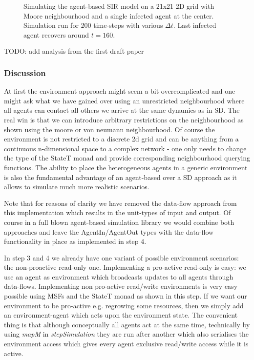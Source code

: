 \begin{figure}
\begin{center}
	\caption{Simulating the agent-based SIR model on a 21x21 2D grid with Moore neighbourhood and a single infected agent at the center. Simulation run for 200 time-steps with various $\Delta t$. Last infected agent recovers around $t = 160$.}
	\label{fig:sir_env}
\end{center}
\end{figure}

TODO: add analysis from the first draft paper

\subsubsection{Discussion}
At first the environment approach might seem a bit overcomplicated and one might ask what we have gained over using an unrestricted neighbourhood where all agents can contact all others we arrive at the same dynamics as in SD. The real win is that we can introduce arbitrary restrictions on the neighbourhood as shown using the moore or von neumann neighbourhood. 
Of course the environment is not restricted to a discrete 2d grid and can be anything from a continuous n-dimensional space to a complex network - one only needs to change the type of the StateT monad and provide corresponding neighbourhood querying functions. The ability to place the heterogeneous agents in a generic environment is also the fundamental advantage of an agent-based over a SD approach as it allows to simulate much more realistic scenarios.

Note that for reasons of clarity we have removed the data-flow approach from this implementation which results in the unit-types of input and output. Of course in a full blown agent-based simulation library we would combine both approaches and leave the AgentIn/AgentOut types with the data-flow functionality in place as implemented in step 4.

In step 3 and 4 we already have one variant of possible environment scenarios: the non-proactive read-only one. Implementing a pro-active read-only is easy: we use an agent as environment which broadcasts updates to all agents through data-flows. Implementing non pro-active read/write environments is very easy possible using MSFs and the StateT monad as shown in this step. If we want our environment to be pro-active e.g. regrowing some resources, then we simply add an environment-agent which acts upon the environment state. The convenient thing is that although conceptually all agents act at the same time, technically by using \textit{mapM} in \textit{stepSimulation} they are run after another which also serialises the environment access which gives every agent exclusive read/write access while it is active.

